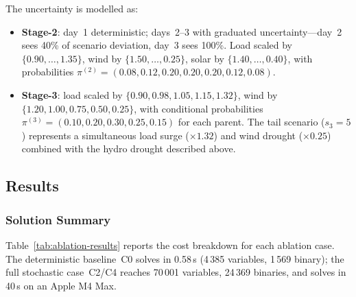 \documentclass[11pt]{article}
\begin{document}
The uncertainty is modelled as:
\begin{itemize}[nosep]
  \item \textbf{Stage-2}: day~1 deterministic; days~2--3 with
        graduated uncertainty---day~2 sees 40\% of scenario deviation,
        day~3 sees 100\%. Load scaled by $\{0.90,\ldots,1.35\}$,
        wind by $\{1.50,\ldots,0.25\}$,
        solar by $\{1.40,\ldots,0.40\}$,
        with probabilities
        $\pi^{(2)} = (0.08,0.12,0.20,0.20,0.20,0.12,0.08)$.
  \item \textbf{Stage-3}: load scaled by
        $\{0.90,0.98,1.05,1.15,1.32\}$,
        wind by $\{1.20,1.00,0.75,0.50,0.25\}$,
        with conditional probabilities
        $\pi^{(3)} = (0.10,0.20,0.30,0.25,0.15)$ for each parent.
        The tail scenario ($s_3=5$) represents a simultaneous load surge
        ($\times 1.32$) and wind drought ($\times 0.25$) combined with
        the hydro drought described above.
\end{itemize}

\subsection{Results}\label{sec:results}

\subsubsection{Solution Summary}

Table~\ref{tab:ablation-results} reports the cost breakdown for each
ablation case. The deterministic baseline~C0 solves in 0.58\,s
(4\,385 variables, 1\,569 binary); the full stochastic case~C2/C4
reaches 70\,001 variables, 24\,369 binaries, and solves in 40\,s
on an Apple M4 Max.
\end{document}
